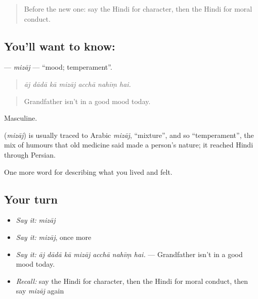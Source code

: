 \label{lesson:HI-C475-mizaj}



\begin{quote}
Before the new one: say the Hindi for character, then the Hindi for moral conduct.
\end{quote}

\subsection*{You'll want to know: }
\textbf{} — \emph{mizāj} — \textquotedblleft{}mood; temperament\textquotedblright{}.

\begin{quote}
      
\end{quote}

\begin{quote}
\emph{āj dādā kā mizāj acchā nahīṃ hai.}
\end{quote}

\begin{quote}
Grandfather isn't in a good mood today.
\end{quote}

Masculine.

\begin{cousinweb}
\textbf{} (\emph{mizāj}) is usually traced to Arabic \emph{mizāj}, \textquotedblleft{}mixture\textquotedblright{}, and so \textquotedblleft{}temperament\textquotedblright{}, the mix of humours that old medicine said made a person's nature; it reached Hindi through Persian.
\end{cousinweb}

\begin{grammarlens}[title={What you've built}]
One more word for describing what you lived and felt.
\end{grammarlens}

\subsection*{Your turn}
\begin{itemize}
\raggedright
  \item \emph{Say it:} \emph{mizāj}
  \item \emph{Say it:} \emph{mizāj}, once more
  \item \emph{Say it:} \emph{āj dādā kā mizāj acchā nahīṃ hai.} — Grandfather isn't in a good mood today.
  \item \emph{Recall:} say the Hindi for character, then the Hindi for moral conduct, then say \emph{mizāj} again
\end{itemize}

